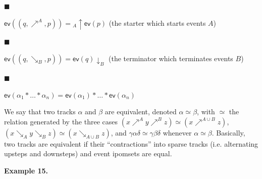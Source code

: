 \documentclass[10pt,a4paper]{article}
\begin{document}
 
 
\par\noindent  $\blacksquare$ 
 
$\mathsf{ev}((q,\mathrel{\nearrow^{A}},p))={}_{A\!}{\uparrow}{\mathsf{ev}(p)}$ (the starter which starts events $A$)\par
 
 
 
\par\noindent  $\blacksquare$ 
 
$\mathsf{ev}((q,\mathrel{\searrow_{B}},p))={\mathsf{ev}(q)}{\downarrow}_{B}$ (the terminator which terminates events $B$)\par
 
 
 
\par\noindent  $\blacksquare$ 
 
$\mathsf{ev}(\alpha_{1}*\dots*\alpha_{n})=\mathsf{ev}(\alpha_{1})*\dots*\mathsf{ev}(\alpha_{n})$\par
 
 
  
We say that two tracks $\alpha$ and $\beta$ are equivalent, denoted $\alpha\simeq\beta$, with $\simeq$ the relation generated by the three cases $(x\mathrel{\nearrow^{A}}y\mathrel{\nearrow^{B}}z)\simeq(x\mathrel{\nearrow^{A\cup B}}z)$, $(x\mathrel{\searrow_{A}}y\mathrel{\searrow_{B}}z)\simeq(x\mathrel{\searrow_{A\cup B}}z)$, and $\gamma\alpha\delta\simeq\gamma\beta\delta$ whenever $\alpha\simeq\beta$. Basically, two tracks are equivalent if their “contractions” into sparse tracks (i.e. alternating upsteps and downsteps) and event ipomsets are equal.\par
 
 
 
\par\medskip\noindent\textbf{Example 15.}\par
 
 
\end{document}
